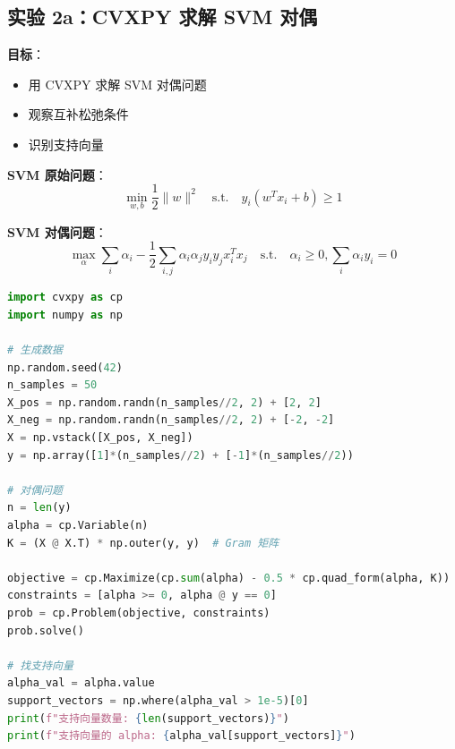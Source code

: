 \documentclass[12pt, a4paper]{ctexart}
\begin{document}
\subsection{实验 2a：CVXPY 求解 SVM 对偶}

\begin{experiment}

\textbf{目标}：
\begin{itemize}
    \item 用 CVXPY 求解 SVM 对偶问题
    \item 观察互补松弛条件
    \item 识别支持向量
\end{itemize}

\textbf{SVM 原始问题}：
\[
\min_{w, b} \frac{1}{2}\|w\|^2 \quad \text{s.t.} \quad y_i(w^T x_i + b) \geq 1
\]

\textbf{SVM 对偶问题}：
\[
\max_{\alpha} \sum_i \alpha_i - \frac{1}{2} \sum_{i,j} \alpha_i \alpha_j y_i y_j x_i^T x_j \quad \text{s.t.} \quad \alpha_i \geq 0, \sum_i \alpha_i y_i = 0
\]

\end{experiment}

\begin{blackboard}[实验代码框架]

\begin{lstlisting}[language=Python]
import cvxpy as cp
import numpy as np

# 生成数据
np.random.seed(42)
n_samples = 50
X_pos = np.random.randn(n_samples//2, 2) + [2, 2]
X_neg = np.random.randn(n_samples//2, 2) + [-2, -2]
X = np.vstack([X_pos, X_neg])
y = np.array([1]*(n_samples//2) + [-1]*(n_samples//2))

# 对偶问题
n = len(y)
alpha = cp.Variable(n)
K = (X @ X.T) * np.outer(y, y)  # Gram 矩阵

objective = cp.Maximize(cp.sum(alpha) - 0.5 * cp.quad_form(alpha, K))
constraints = [alpha >= 0, alpha @ y == 0]
prob = cp.Problem(objective, constraints)
prob.solve()

# 找支持向量
alpha_val = alpha.value
support_vectors = np.where(alpha_val > 1e-5)[0]
print(f"支持向量数量: {len(support_vectors)}")
print(f"支持向量的 alpha: {alpha_val[support_vectors]}")
\end{lstlisting}

\end{blackboard}
\end{document}
